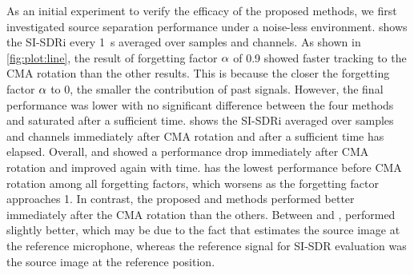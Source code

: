 \documentclass[sip,biber]{now-journal}
\begin{document}
As an initial experiment to verify the efficacy of the proposed methods, we first investigated source separation performance under a noise-less environment.
 shows the SI-SDRi every \SI{1}{\second} averaged over samples and channels.
As shown in \cref{fig:plot:line}, the result of forgetting factor $\alpha$ of 0.9 showed faster tracking to the CMA rotation than the other results.
This is because the closer the forgetting factor $\alpha$ to 0, the smaller the contribution of past signals.
However, the final performance was lower with no significant difference between the four methods and saturated after a sufficient time.
 shows the SI-SDRi averaged over samples and channels immediately after CMA rotation and after a sufficient time has elapsed.
Overall, \NaiveIVA{} and \ResetIVA{} showed a performance drop immediately after CMA rotation and improved again with time.
\ResetIVA{} has the lowest performance before CMA rotation among all forgetting factors, which worsens as the forgetting factor approaches 1.
In contrast, the proposed \SFIIVAm{} and \SFIIVAo{} methods performed better immediately after the CMA rotation than the others.
Between \SFIIVAm{} and \SFIIVAo{}, \SFIIVAm{} performed slightly better,
which may be due to the fact that \SFIIVAo{} estimates the source image at the reference microphone,
whereas the reference signal for SI-SDR evaluation was the source image at the reference position.
\end{document}
